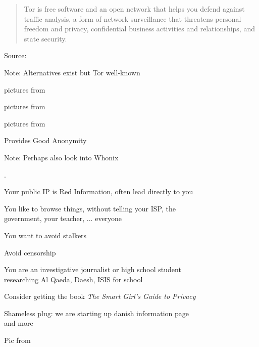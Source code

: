 \documentclass[20pt,landscape,a4paper,footrule]{foils}
\begin{document}


\begin{quote}
Tor is free software and an open network that helps you defend against traffic analysis, a form of network surveillance that threatens personal freedom and privacy, confidential business activities and relationships, and state security.
\end{quote}
Source: 


Note: Alternatives exist but Tor well-known




\centerline{pictures from }



\centerline{pictures from }



\centerline{pictures from }




\centerline{\color{titlecolor} Provides Good Anonymity}

Note: Perhaps also look into Whonix 


.
\begin{list2}
\item Your public IP is {\color{red}Red Information}, often lead directly to you
\item You like to browse things, without telling your ISP, the\\
government, your teacher, ... everyone
\item You want to avoid stalkers
\item Avoid censorship
\item You are an investigative journalist or high school student\\
researching Al Qaeda, Daesh, ISIS for school
\item Consider getting the book \emph{The Smart Girl's Guide to Privacy}\\ 
\end{list2}

Shameless plug: we are starting up danish information page\\
and more 

Pic from 
\end{document}
